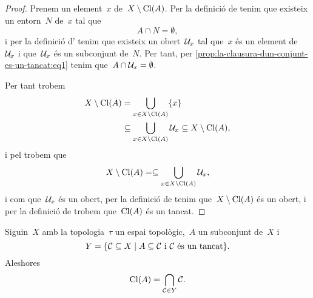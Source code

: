 \documentclass[../../main.tex]{subfiles}
\begin{document}
    \begin{proof}
         Prenem un element~\(x\) de~\(X\setminus\operatorname{Cl}(A)\).
         Per la definició de  tenim que existeix un entorn~\(N\) de~\(x\) tal que
         \begin{equation}
             \label{prop:la-clausura-dun-conjunt-es-un-tancat:eq1}
             A\cap N=\emptyset,
         \end{equation}
         i per la definició d' tenim que existeix un obert~\(\mathcal{U}_{x}\) tal que~\(x\) és un element de~\(\mathcal{U}_{x}\) i que~\(\mathcal{U}_{x}\) és un subconjunt de~\(N\).
         Per tant, per \eqref{prop:la-clausura-dun-conjunt-es-un-tancat:eq1} tenim que~\(A\cap\mathcal{U}_{x}=\emptyset\).

         Per tant trobem
         \begin{align*}
             X\setminus\operatorname{Cl}(A)&=\bigcup_{x\in X\setminus\operatorname{Cl}(A)}\{x\} \\
             &\subseteq\bigcup_{x\in X\setminus\operatorname{Cl}(A)}\mathcal{U}_{x}\subseteq X\setminus\operatorname{Cl}(A),
         \end{align*}
         i pel  trobem que
         \[
             X\setminus\operatorname{Cl}(A)=\subseteq\bigcup_{x\in X\setminus\operatorname{Cl}(A)}\mathcal{U}_{x},
         \]
         i com que~\(\mathcal{U}_{x}\) és un obert, per la definició de  tenim que~\(X\setminus\operatorname{Cl}(A)\) és un obert, i per la definició de  trobem que~\(\operatorname{Cl}(A)\) és un tancat.
    \end{proof}
    \begin{proposition}
        \label{prop:la-clausura-dun-conjunt-es-linterseccio-de-tots-els-tancats-que-contenen-el-conjunt}
        Siguin~\(X\) amb la topologia~\(\tau\) un espai topològic,~\(A\) un subconjunt de~\(X\) i
        \[
            Y=\{\mathcal{C}\subseteq X\mid A\subseteq\mathcal{C}\text{ i }\mathcal{C}\text{ és un tancat}\}.
        \]
        Aleshores
        \[
            \operatorname{Cl}(A)=\bigcap_{\mathcal{C}\in Y}\mathcal{C}.
        \]
    \end{proposition}
\end{document}
